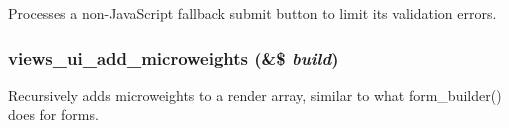\label{admin_8inc_a77ce1a8b53feb8ec8c024fa4eb8c18e3}
Processes a non-\/JavaScript fallback submit button to limit its validation errors. \hypertarget{admin_8inc_a21c22d965161a3efb6b1f10570d3f9cd}{
\subsubsection[{views\_\-ui\_\-add\_\-microweights}]{\setlength{\rightskip}{0pt plus 5cm}views\_\-ui\_\-add\_\-microweights (\&\$ {\em build})}}
\label{admin_8inc_a21c22d965161a3efb6b1f10570d3f9cd}
Recursively adds microweights to a render array, similar to what form\_\-builder() does for forms.

